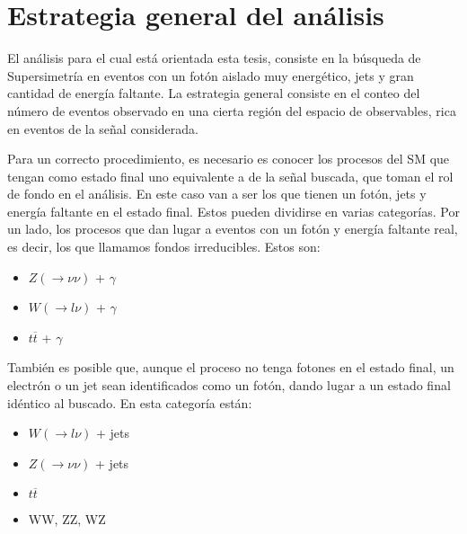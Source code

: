 \chapter{Estrategia general del análisis}


El análisis para el cual está orientada esta tesis, consiste en la búsqueda de Supersimetría en eventos con un fotón aislado muy energético, jets y gran cantidad de energía faltante. La estrategia general consiste en el conteo del número de eventos observado en una cierta región del espacio de observables, rica en eventos de la señal considerada.

Para un correcto procedimiento, es necesario es conocer los procesos del SM que tengan como estado final uno equivalente a de la señal buscada, que toman el rol de fondo en el análisis. En este caso van a ser los que tienen un fotón, jets y energía faltante en el estado final. Estos pueden dividirse en varias categorías. Por un lado, los procesos que dan lugar a eventos con un fotón y energía faltante
real, es decir, los que llamamos fondos irreducibles. Estos son:

\begin{itemize}

	\item $Z(\rightarrow \nu\nu)$ + $\gamma$

	\item $W (\rightarrow l\nu)$ + $\gamma$

	\item $t \overline{t}$ + $\gamma$

\end{itemize}

También es posible que, aunque el proceso no tenga fotones en el estado final, un electrón o un jet sean identificados como un fotón, dando lugar a un estado final idéntico al buscado. En esta categoría están:

\begin{itemize}

	\item $W (\rightarrow l\nu)$ + jets

	\item $Z (\rightarrow \nu\nu)$ + jets

	\item $t \overline{t}$

	\item WW, ZZ, WZ

\end{itemize}

